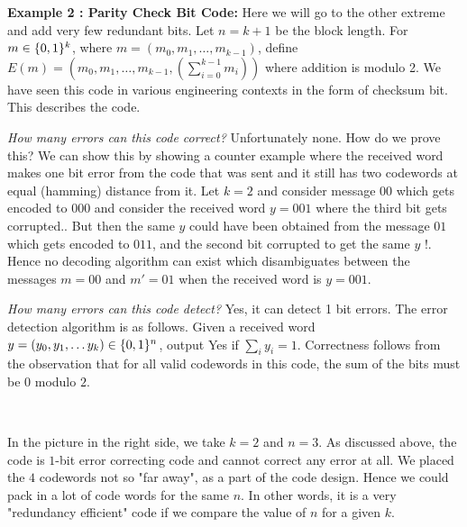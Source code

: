 \begin{description}
\item{\bf Example 2 : Parity Check Bit Code:}
Here we will go to the other extreme and add very few redundant bits. Let $n=k+1$ be the block length. For $m \in \{0,1\}^k$, where $m = (m_0,m_1,\ldots,m_{k-1})$, define $E(m) = \left(m_0, m_1, \ldots, m_{k-1}, \left( \sum_{i=0}^{k-1} m_i\right)\right)$ where addition is modulo 2. We have seen this code in various engineering contexts in the form of checksum bit. This describes the code.

\textit{How many errors can this code correct?} Unfortunately none. How do we prove this? We can show this by showing a counter example where the received word makes one bit error from the code that was sent and it still has two codewords at equal (hamming) distance from it. Let $k=2$ and consider message $00$ which gets encoded to $000$ and consider the received word $y = 001$ where the third bit gets corrupted.. But then the same $y$ could have been obtained from the message $01$ which gets encoded to $011$, and the second bit corrupted to get the same $y$ !. Hence no decoding algorithm can exist which disambiguates between the messages $m=00$ and $m'=01$ when the received word is $y = 001$.

\textit{How many errors can this code detect?} Yes, it can detect 1 bit errors. The error detection algorithm is as follows. Given a received word $y=(y_0, y_1, \ldots y_k) \in \{0,1\}^n$, output {\sc Yes} if $\sum_i y_i = 1$. Correctness follows from the observation that for all valid codewords in this code, the sum of the bits must be $0$ modulo $2$.\\

\begin{minipage}{0.03\linewidth}
~~
\end{minipage}
\hspace{-6mm}\begin{minipage}{0.57\linewidth}
In the picture in the right side, we take $k=2$ and $n=3$. As discussed above, the code is $1$-bit error correcting code and cannot correct any error at all. We placed the $4$ codewords not so "far away", as a part of the code design. Hence we could pack in a lot of code words for the same $n$. In other words, it is a very "redundancy efficient" code if we compare the value of $n$ for a given $k$.
\end{minipage}
\begin{minipage}{0.04\linewidth}
~~
\end{minipage}
\begin{minipage}{0.3\linewidth}
\vspace{1mm}
\end{minipage}

\end{description}

